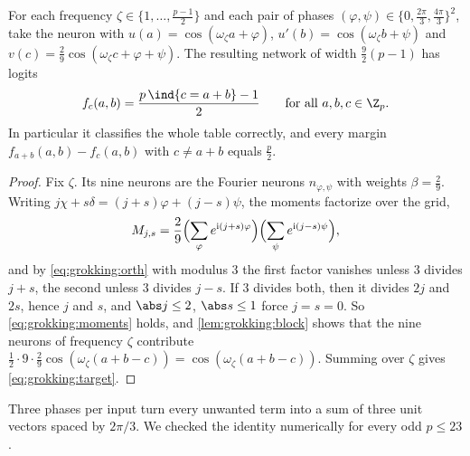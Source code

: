 \begin{refsection}
\begin{theorem}\label{thm:grokking:fourier}
For each frequency $\zeta\in\{1,\dots,\frac{p-1}2\}$ and each pair of phases $(\varphi,\psi)\in\{0,\frac{2\pi}3,\frac{4\pi}3\}^2$, take the neuron with $u(a)=\cos(\omega_\zeta a+\varphi)$, $u'(b)=\cos(\omega_\zeta b+\psi)$ and $v(c)=\frac29\cos(\omega_\zeta c+\varphi+\psi)$. The resulting network of width $\frac92(p-1)$ has logits
\[
  f_c(a,b)=\frac{p\,\ind\{c=a+b\}-1}2\qquad\text{for all }a,b,c\in\grokZp .
\]
In particular it classifies the whole table correctly, and every margin $f_{a+b}(a,b)-f_c(a,b)$ with $c\ne a+b$ equals $\frac p2$.
\end{theorem}

\begin{proof}
Fix $\zeta$. Its nine neurons are the Fourier neurons $n_{\varphi,\psi}$ with weights $\beta=\frac29$. Writing $j\chi+s\delta=(j+s)\varphi+(j-s)\psi$, the moments factorize over the grid,
\[
  M_{j,s}=\frac29\Bigl(\sum_{\varphi}e^{\mathrm{i}(j+s)\varphi}\Bigr)\Bigl(\sum_{\psi}e^{\mathrm{i}(j-s)\psi}\Bigr),
\]
and by \eqref{eq:grokking:orth} with modulus $3$ the first factor vanishes unless $3$ divides $j+s$, the second unless $3$ divides $j-s$. If $3$ divides both, then it divides $2j$ and $2s$, hence $j$ and $s$, and $\abs j\le2$, $\abs s\le1$ force $j=s=0$. So \eqref{eq:grokking:moments} holds, and \cref{lem:grokking:block} shows that the nine neurons of frequency $\zeta$ contribute $\frac12\cdot9\cdot\frac29\cos(\omega_\zeta(a+b-c))=\cos(\omega_\zeta(a+b-c))$. Summing over $\zeta$ gives \eqref{eq:grokking:target}.
\end{proof}

Three phases per input turn every unwanted term into a sum of three unit vectors spaced by $2\pi/3$. We checked the identity numerically for every odd $p\le23$.


\end{refsection}

